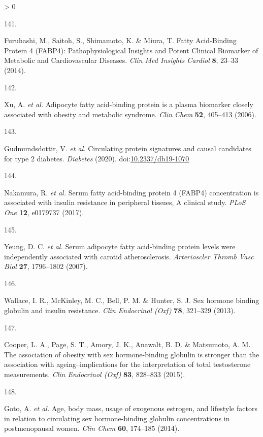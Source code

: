 \documentclass[11pt,twoside]{bristolthesis}
\newlength{\cslhangindent}
\newlength{\csllabelwidth}
\newenvironment{CSLReferences}[2] %
 {%
  \setlength{\parindent}{0pt}
  \ifodd #1 \everypar{\setlength{\hangindent}{\cslhangindent}}\ignorespaces\fi
  \ifnum #2 > 0
  \setlength{\parskip}{#2\baselineskip}
  \fi
 }%
 {}
\newcommand{\CSLLeftMargin}[1]{\parbox[t]{\csllabelwidth}{#1}}
\newcommand{\CSLRightInline}[1]{\parbox[t]{\linewidth - \csllabelwidth}{#1}\break}
\begin{document}
\begin{CSLReferences}{0}{0}
\leavevmode\hypertarget{ref-Furuhashi2014}{}%
\CSLLeftMargin{141. }
\CSLRightInline{Furuhashi, M., Saitoh, S., Shimamoto, K. \& Miura, T. {Fatty Acid-Binding Protein 4 (FABP4): Pathophysiological Insights and Potent Clinical Biomarker of Metabolic and Cardiovascular Diseases}. \emph{Clin Med Insights Cardiol} \textbf{8}, 23--33 (2014).}

\leavevmode\hypertarget{ref-Xu2006}{}%
\CSLLeftMargin{142. }
\CSLRightInline{Xu, A. \emph{et al.} {Adipocyte fatty acid-binding protein is a plasma biomarker closely associated with obesity and metabolic syndrome}. \emph{Clin Chem} \textbf{52}, 405--413 (2006).}

\leavevmode\hypertarget{ref-Gudmundsdottir2020}{}%
\CSLLeftMargin{143. }
\CSLRightInline{Gudmundsdottir, V. \emph{et al.} {Circulating protein signatures and causal candidates for type 2 diabetes}. \emph{Diabetes} (2020). doi:\href{https://doi.org/10.2337/db19-1070}{10.2337/db19-1070}}

\leavevmode\hypertarget{ref-Nakamura2017}{}%
\CSLLeftMargin{144. }
\CSLRightInline{Nakamura, R. \emph{et al.} {Serum fatty acid-binding protein 4 (FABP4) concentration is associated with insulin resistance in peripheral tissues, A clinical study}. \emph{PLoS One} \textbf{12}, e0179737 (2017).}

\leavevmode\hypertarget{ref-Yeung2007}{}%
\CSLLeftMargin{145. }
\CSLRightInline{Yeung, D. C. \emph{et al.} {Serum adipocyte fatty acid-binding protein levels were independently associated with carotid atherosclerosis}. \emph{Arterioscler Thromb Vasc Biol} \textbf{27}, 1796--1802 (2007).}

\leavevmode\hypertarget{ref-Wallace2013}{}%
\CSLLeftMargin{146. }
\CSLRightInline{Wallace, I. R., McKinley, M. C., Bell, P. M. \& Hunter, S. J. {Sex hormone binding globulin and insulin resistance}. \emph{Clin Endocrinol (Oxf)} \textbf{78}, 321--329 (2013).}

\leavevmode\hypertarget{ref-Cooper2015}{}%
\CSLLeftMargin{147. }
\CSLRightInline{Cooper, L. A., Page, S. T., Amory, J. K., Anawalt, B. D. \& Matsumoto, A. M. {The association of obesity with sex hormone-binding globulin is stronger than the association with ageing--implications for the interpretation of total testosterone measurements}. \emph{Clin Endocrinol (Oxf)} \textbf{83}, 828--833 (2015).}

\leavevmode\hypertarget{ref-Goto2014}{}%
\CSLLeftMargin{148. }
\CSLRightInline{Goto, A. \emph{et al.} {Age, body mass, usage of exogenous estrogen, and lifestyle factors in relation to circulating sex hormone-binding globulin concentrations in postmenopausal women}. \emph{Clin Chem} \textbf{60}, 174--185 (2014).}


\end{CSLReferences}
\end{document}
